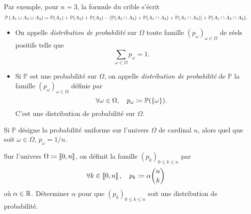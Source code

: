 \documentclass{magnolia}
\begin{document}
\begin{remarqueUnique}
\remarque   Par exemple, pour $n=3$, la formule du crible s'écrit
\[\mathbb{P}\left(A_1\cup A_2\cup A_3\right)=\mathbb{P}(A_1)+\mathbb{P}(A_2)+\mathbb{P}(A_3) - \left[\mathbb{P}(A_2\cap A_3)+\mathbb{P}(A_1\cap A_3)+\mathbb{P}(A_1\cap A_2)\right]+\mathbb{P}(A_1\cap A_2\cap A_3).\]
\end{remarqueUnique}


\begin{definition}
\begin{itemize}
\item On appelle \emph{distribution de probabilité} sur
  $\Omega$ toute famille $(p_{\omega})_{\omega\in\Omega}$ de réels positifs telle que
  \[\sum_{\omega\in\Omega} p_{\omega}=1.\]
\item Si $\mathbb{P}$ est une probabilité sur $\Omega$, on appelle \emph{distribution de
  probabilité} de $\mathbb{P}$ la famille $(p_{\omega})_{\omega\in\Omega}$ définie par
  \[\forall \omega\in\Omega,\quad p_{\omega}\coloneqq \mathbb{P}(\left\{\omega\right\}).\]
  C'est une distribution de probabilité sur $\Omega$.
\end{itemize}
\end{definition}

\begin{remarqueUnique}
  \remarque Si $\mathbb{P}$ désigne la probabilité uniforme sur l'univers $\Omega$ de cardinal $n$, alors
quel que soit $\omega\in\Omega$, $p_\omega=1/n$.
\end{remarqueUnique}

\begin{exoUnique}
\exo Sur l'univers $\Omega\coloneqq\left\llbracket 0,n\right\rrbracket$, on définit la famille $(p_k)_{0\leq k\leq n}$ par
  \[\forall k\in\left\llbracket 0,n\right\rrbracket,\quad p_k\coloneqq\alpha\binom{n}{k}\]
  où $\alpha\in\mathbb{R}$. Déterminer $\alpha$ pour que $(p_k)_{0\leq k\leq n}$ soit une distribution de probabilité. 
\end{exoUnique}
\end{document}
